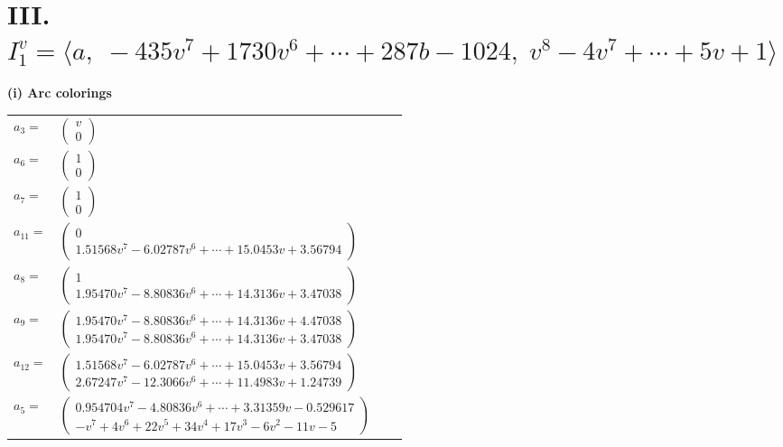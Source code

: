 \documentclass[1p]{elsarticle_modified}
\theoremstyle{definition}
\begin{document}
\centering \section*{III. $I^v_{1}= \langle a,\;-435 v^7+1730 v^6+\cdots+287 b-1024,\;v^8-4 v^7+\cdots+5 v+1 \rangle$}
\flushleft \textbf{(i) Arc colorings}\\
\begin{tabular}{m{7pt} m{180pt} m{7pt} m{180pt} }
\flushright $a_{3}=$&$\begin{pmatrix}v\\0\end{pmatrix}$ \\
\flushright $a_{6}=$&$\begin{pmatrix}1\\0\end{pmatrix}$ \\
\flushright $a_{7}=$&$\begin{pmatrix}1\\0\end{pmatrix}$ \\
\flushright $a_{11}=$&$\begin{pmatrix}0\\1.51568 v^{7}-6.02787 v^{6}+\cdots+15.0453 v+3.56794\end{pmatrix}$ \\
\flushright $a_{8}=$&$\begin{pmatrix}1\\1.95470 v^{7}-8.80836 v^{6}+\cdots+14.3136 v+3.47038\end{pmatrix}$ \\
\flushright $a_{9}=$&$\begin{pmatrix}1.95470 v^{7}-8.80836 v^{6}+\cdots+14.3136 v+4.47038\\1.95470 v^{7}-8.80836 v^{6}+\cdots+14.3136 v+3.47038\end{pmatrix}$ \\
\flushright $a_{12}=$&$\begin{pmatrix}1.51568 v^{7}-6.02787 v^{6}+\cdots+15.0453 v+3.56794\\2.67247 v^{7}-12.3066 v^{6}+\cdots+11.4983 v+1.24739\end{pmatrix}$ \\
\flushright $a_{5}=$&$\begin{pmatrix}0.954704 v^{7}-4.80836 v^{6}+\cdots+3.31359 v-0.529617\\- v^7+4 v^6+22 v^5+34 v^4+17 v^3-6 v^2-11 v-5\end{pmatrix}$ \\

\end{tabular}
\end{document}
